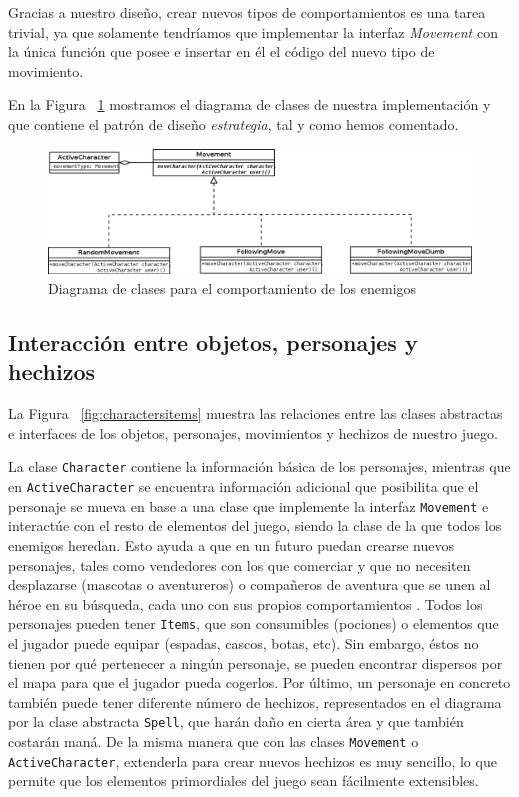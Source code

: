 \noindent Gracias a nuestro diseño, crear nuevos tipos de comportamientos es una tarea trivial, ya que solamente tendríamos que implementar la interfaz \textit{Movement} con la única función que posee e insertar en él el código del nuevo tipo de movimiento.

En la Figura ~\ref{fig:iaenemy} mostramos el diagrama de clases de nuestra implementación y que contiene el patrón de diseño \textit{estrategia}, tal y como hemos comentado.

\begin{figure}
    \includegraphics[width=\textwidth,height=\textheight,keepaspectratio]{./img/iaenemy.png}
  \caption{Diagrama de clases para el comportamiento de los enemigos}
  \label{fig:iaenemy}
\end{figure}

\subsection{Interacción entre objetos, personajes y hechizos}

La Figura ~\ref{fig:charactersitems} muestra las relaciones entre las clases abstractas e interfaces de los objetos, personajes, movimientos y hechizos de nuestro juego.

La clase \texttt{Character} contiene la información básica de los personajes, mientras que en \texttt{ActiveCharacter} se encuentra información adicional que posibilita que el personaje se mueva en base a una clase que implemente la interfaz \texttt{Movement} e interactúe con el resto de elementos del juego, siendo la clase de la que todos los enemigos heredan. Esto ayuda a que en un futuro puedan crearse nuevos personajes, tales como vendedores con los que comerciar y que no necesiten desplazarse (mascotas o aventureros) o compañeros de aventura que se unen al héroe en su búsqueda, cada uno con sus propios comportamientos \cite[Capítulo 4]{Schwab2009a}. 
Todos los personajes pueden tener \texttt{Items}, que son consumibles (pociones) o elementos que el jugador puede equipar (espadas, cascos, botas, etc). Sin embargo, éstos no tienen por qué pertenecer a ningún personaje, se pueden encontrar dispersos por el mapa para que el jugador pueda cogerlos.
Por último, un personaje en concreto también puede tener diferente número de hechizos, representados en el diagrama por la clase abstracta \texttt{Spell}, que harán daño en cierta área y que también costarán maná. De la misma manera que con las clases \texttt{Movement} o \texttt{ActiveCharacter}, extenderla para crear nuevos hechizos es muy sencillo, lo que permite que los elementos primordiales del juego sean fácilmente extensibles.

